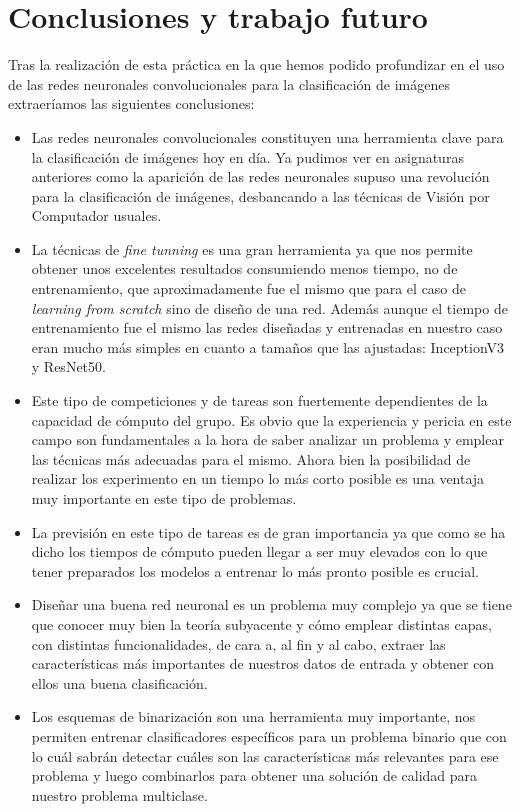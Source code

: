 \section{Conclusiones y trabajo futuro}

Tras la realización de esta práctica en la que hemos podido profundizar en el uso de las redes neuronales convolucionales para la clasificación de imágenes extraeríamos las siguientes conclusiones:

\begin{itemize}
\item Las redes neuronales convolucionales constituyen una herramienta clave para la clasificación de imágenes hoy en día. Ya pudimos ver en asignaturas anteriores como la aparición de las redes neuronales supuso una revolución para la clasificación de imágenes, desbancando a las técnicas de Visión por Computador usuales.
\item La técnicas de \textit{fine tunning} es una gran herramienta ya que nos permite obtener unos excelentes resultados consumiendo menos tiempo, no de entrenamiento, que aproximadamente fue el mismo que para el caso de \textit{learning from scratch} sino de diseño de una red. Además aunque el tiempo de entrenamiento fue el mismo las redes diseñadas y entrenadas en nuestro caso eran mucho más simples en cuanto a tamaños que las ajustadas: InceptionV3 y ResNet50.
\item Este tipo de competiciones y de tareas son fuertemente dependientes de la capacidad de cómputo del grupo. Es obvio que la experiencia y pericia en este campo son fundamentales a la hora de saber analizar un problema y emplear las técnicas más adecuadas para el mismo. Ahora bien la posibilidad de realizar los experimento en un tiempo lo más corto posible es una ventaja muy importante en este tipo de problemas.
\item La previsión en este tipo de tareas es de gran importancia ya que como se ha dicho los tiempos de cómputo pueden llegar a ser muy elevados con lo que tener preparados los modelos a entrenar lo más pronto posible es crucial.
\item Diseñar una buena red neuronal es un problema muy complejo ya que se tiene que conocer muy bien la teoría subyacente y cómo emplear distintas capas, con distintas funcionalidades, de cara a, al fin y al cabo, extraer las características más importantes de nuestros datos de entrada y obtener con ellos una buena clasificación.
\item Los esquemas de binarización son una herramienta muy importante, nos permiten entrenar clasificadores específicos para un problema binario que con lo cuál sabrán detectar cuáles son las características más relevantes para ese problema y luego combinarlos para obtener una solución de calidad para nuestro problema multiclase.
\end{itemize}

